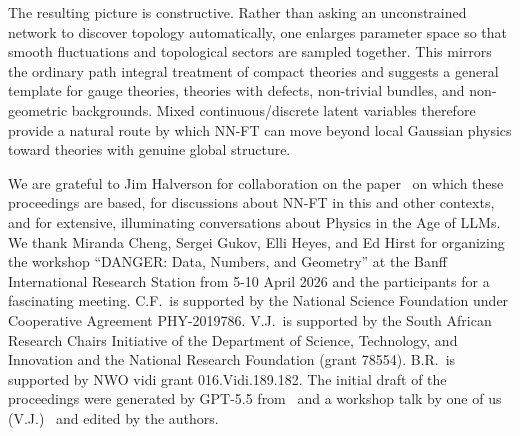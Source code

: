\documentclass[11pt,a4paper]{article}
\begin{document}
The resulting picture is constructive. Rather than asking an unconstrained network to discover topology automatically, one enlarges parameter space so that smooth fluctuations and topological sectors are sampled together. This mirrors the ordinary path integral treatment of compact theories and suggests a general template for gauge theories, theories with defects, non-trivial bundles, and non-geometric backgrounds. Mixed continuous/discrete latent variables therefore provide a natural route by which NN-FT can move beyond local Gaussian physics toward theories with genuine global structure.

\acknowledgments
We are grateful to Jim Halverson for collaboration on the paper~\cite{Ferko:2026ken} on which these proceedings are based, for discussions about NN-FT in this and other contexts, and for extensive, illuminating conversations about Physics in the Age of LLMs.
We thank Miranda Cheng, Sergei Gukov, Elli Heyes, and Ed Hirst for organizing the workshop ``DANGER: Data, Numbers, and Geometry'' at the Banff International Research Station from 5-10 April 2026 and the participants for a fascinating meeting.
C.F.\ is supported by the National Science Foundation under Cooperative Agreement PHY-2019786.
V.J.\ is supported by the South African Research Chairs Initiative of the Department of Science, Technology, and Innovation and the National Research Foundation (grant 78554).
B.R.\ is supported by NWO vidi grant 016.Vidi.189.182.
The initial draft of the proceedings were generated by GPT-5.5 from~\cite{Ferko:2026ken} and a workshop talk by one of us (V.J.)~\cite{Jejjala:2026Banff} and edited by the authors.



\end{document}
